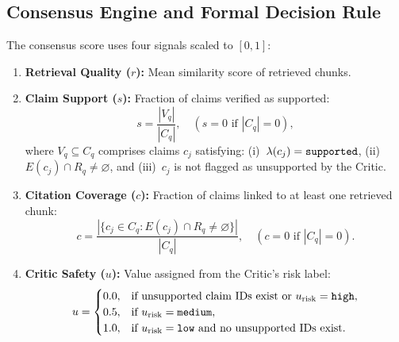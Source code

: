 \documentclass[conference]{IEEEtran}
\begin{document}
\subsection{Consensus Engine and Formal Decision Rule}
\label{sec:score}
The consensus score uses four signals scaled to $[0,1]$:
\begin{enumerate}
  \item \textbf{Retrieval Quality ($r$):} Mean similarity score of retrieved chunks.
  \item \textbf{Claim Support ($s$):} Fraction of claims verified as supported:
    \begin{equation}
      s = \frac{|V_q|}{|C_q|}, \quad (s = 0 \text{ if } |C_q| = 0),
    \end{equation}
    where $V_q \subseteq C_q$ comprises claims $c_j$ satisfying: (i)~$\lambda(c_j) =
    \text{\texttt{supported}}$, (ii)~$E(c_j) \cap R_q \neq \varnothing$, and
    (iii)~$c_j$ is not flagged as unsupported by the Critic.
  \item \textbf{Citation Coverage ($c$):} Fraction of claims linked to at least
    one retrieved chunk:
    \begin{equation}
      c = \frac{|\{c_j \in C_q : E(c_j) \cap R_q \neq \varnothing\}|}{|C_q|}, \quad (c = 0 \text{ if } |C_q| = 0).
      \label{eq:cov}
    \end{equation}
  \item \textbf{Critic Safety ($u$):} Value assigned from the Critic's risk label:
    \begin{equation}
      u = \begin{cases}
        0.0, & \text{if unsupported claim IDs exist or } u_{\text{risk}} = \text{\texttt{high}}, \\
        0.5, & \text{if } u_{\text{risk}} = \text{\texttt{medium}}, \\
        1.0, & \text{if } u_{\text{risk}} = \text{\texttt{low} and no unsupported IDs exist}.
      \end{cases}
    \end{equation}
\end{enumerate}
\end{document}
